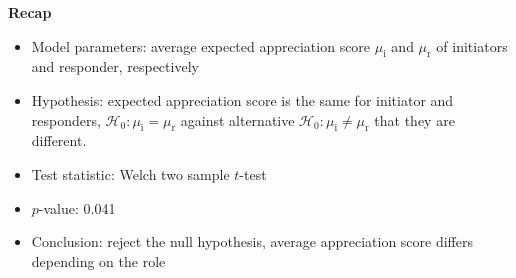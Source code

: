 \documentclass[
  11pt,
  letterpaper,
]{scrbook}
\providecommand{\tightlist}{%
  \setlength{\itemsep}{0pt}\setlength{\parskip}{0pt}}\usepackage{longtable,booktabs,array}
\theoremstyle{definition}
\theoremstyle{definition}
\theoremstyle{remark}
\begin{document}
\textbf{Recap}

\begin{itemize}
\tightlist
\item
  Model parameters: average expected appreciation score
  \(\mu_{\mathrm{i}}\) and \(\mu_{\mathrm{r}}\) of initiators and
  responder, respectively
\item
  Hypothesis: expected appreciation score is the same for initiator and
  responders, \(\mathscr{H}_0: \mu_{\mathrm{i}}=\mu_{\mathrm{r}}\)
  against alternative
  \(\mathscr{H}_0: \mu_{\mathrm{i}} \neq \mu_{\mathrm{r}}\) that they
  are different.
\item
  Test statistic: Welch two sample \(t\)-test
\item
  \(p\)-value: 0.041
\item
  Conclusion: reject the null hypothesis, average appreciation score
  differs depending on the role
\end{itemize}
\end{document}
